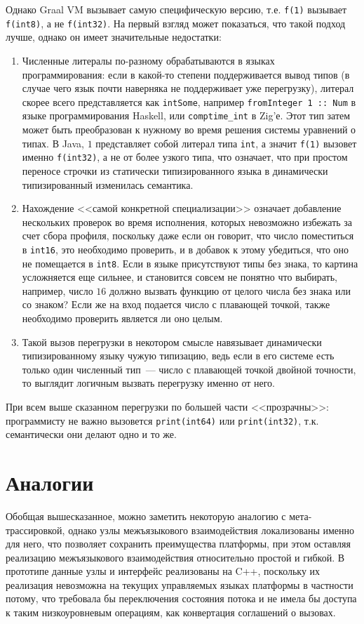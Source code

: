 \documentclass[times
]{itmo-student-thesis}
\begin{document}
Однако Graal VM вызывает самую специфическую версию, т.е. \texttt{f(1)} вызывает \texttt{f(int8)}, а не \texttt{f(int32)}. На первый взгляд может показаться, что такой подход лучше, однако он имеет значительные недостатки:
\begin{enumerate}
	\item Численные литералы по-разному обрабатываются в языках программирования: если в какой-то степени поддерживается вывод типов (в случае чего язык почти наверняка не поддерживает уже перегрузку), литерал скорее всего представляется как \texttt{intSome}, например \texttt{fromInteger 1 :: Num} в языке программирования Haskell, или \texttt{comptime\_int} в Zig'е. Этот тип затем может быть преобразован к нужному во время решения системы уравнений о типах. В Java, $1$ представляет собой литерал типа \texttt{int}, а значит \texttt{f(1)} вызовет именно \texttt{f(int32)}, а не от более узкого типа, что означает, что при простом переносе строчки из статически типизированного языка в динамически типизированный изменилась семантика.
	\item Нахождение <<самой конкретной специализации>> означает добавление нескольких проверок во время исполнения, которых невозможно избежать за счет сбора профиля, поскольку даже если он говорит, что число поместиться в \texttt{int16}, это необходимо проверить, и в добавок к этому убедиться, что оно не помещается в \texttt{int8}. Если в языке присутствуют типы без знака, то картина усложняется еще сильнее, и становится совсем не понятно что выбирать, например, число $16$ должно вызвать функцию от целого числа без знака или со знаком? Если же на вход подается число с плавающей точкой, также необходимо проверить является ли оно целым.
	\item Такой вызов перегрузки в некотором смысле навязывает динамически типизированному языку чужую типизацию, ведь если в его системе есть только один численный тип~--- число с плавающей точкой двойной точности, то выглядит логичным вызвать перегрузку именно от него.
\end{enumerate}
При всем выше сказанном перегрузки по большей части <<прозрачны>>: программисту не важно вызовется \texttt{print(int64)} или \texttt{print(int32)}, т.к. семантически они делают одно и то же.

\section{Аналогии}
Обобщая вышесказанное, можно заметить некоторую аналогию с мета-трассировкой, однако узлы межъязыкового взаимодействия локализованы именно для него, что позволяет сохранить преимущества платформы, при этом оставляя реализацию межъязыкового взаимодействия относительно простой и гибкой. В прототипе данные узлы и интерфейс реализованы на C++, поскольку их реализация невозможна на текущих управляемых языках платформы в частности потому, что требовала бы переключения состояния потока и не имела бы доступа к таким низкоуровневым операциям, как конвертация соглашений о вызовах.
\end{document}
